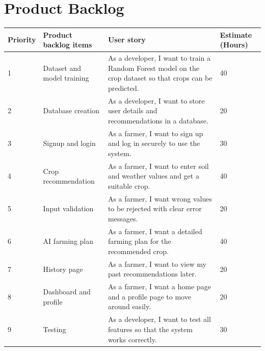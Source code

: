 \section{Product Backlog}
%
%
\renewcommand{\arraystretch}{1.25}
\begin{center}
\begin{tabular}{|m{}|m{}|m{}|m{}|}
\hline
{\bf Priority} & {\bf Product backlog items} & {\bf User story} & {\bf Estimate (Hours)}\\
\hline
1 & Dataset and model training & As a developer, I want to train a Random Forest model on the crop dataset so that crops can be predicted. & 40 \\
\hline
2 & Database creation & As a developer, I want to store user details and recommendations in a database. & 20 \\
\hline
3 & Signup and login & As a farmer, I want to sign up and log in securely to use the system.& 30\\
\hline
4 & Crop recommendation & As a farmer, I want to enter soil and weather values and get a suitable crop. & 40\\
\hline
5 & Input validation &As a farmer, I want wrong values to be rejected with clear error messages. & 20 \\
\hline
6 & AI farming plan &As a farmer, I want a detailed farming plan for the recommended crop. & 40\\
\hline
7 & 	History page&As a farmer, I want to view my past recommendations later.&20\\
\hline
8&	Dashboard and profile&As a farmer, I want a home page and a profile page to move around easily.&20\\
\hline
9&Testing&As a developer, I want to test all features so that the system works correctly.&30\\

\end{tabular}
\end{center}
%
